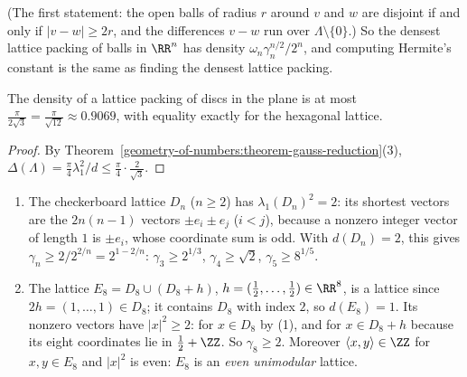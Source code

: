 (The first statement: the open balls of radius $r$ around $v$ and $w$ are disjoint if and only if $|v - w| \geq 2r$, and the differences $v - w$ run over $\Lambda \setminus \{0\}$.) So the densest lattice
packing of balls in $\RR^n$ has density $\omega_n\gamma_n^{n/2}/2^n$, and computing Hermite's constant is the same as finding the densest lattice packing.

\begin{corollary}[Lagrange]\label{geometry-of-numbers:corollary-hexagonal-packing}
The density of a lattice packing of discs in the plane is at most $\frac{\pi}{2\sqrt3} = \frac{\pi}{\sqrt{12}} \approx 0.9069$, with equality exactly for the hexagonal lattice.
\end{corollary}

\begin{proof}
By Theorem~\ref{geometry-of-numbers:theorem-gauss-reduction}(3), $\Delta(\Lambda) = \frac{\pi}{4}\lambda_1^2/d \leq \frac{\pi}{4}\cdot\frac{2}{\sqrt3}$.
\end{proof}

\begin{example}\label{geometry-of-numbers:example-hermite-dn}
\begin{enumerate}
\item The checkerboard lattice $D_n$ ($n \geq 2$) has $\lambda_1(D_n)^2 = 2$: its shortest vectors are the $2n(n - 1)$ vectors $\pm e_i \pm e_j$ ($i < j$), because a nonzero integer vector of length $1$ is
$\pm e_i$, whose coordinate sum is odd. With $d(D_n) = 2$, this gives $\gamma_n \geq 2/2^{2/n} = 2^{1 - 2/n}$: $\gamma_3 \geq 2^{1/3}$, $\gamma_4 \geq \sqrt2$, $\gamma_5 \geq 8^{1/5}$.
\item The lattice $E_8 = D_8 \cup (D_8 + h)$, $h = (\frac12, \ldots, \frac12) \in \RR^8$, is a lattice since $2h = (1, \ldots, 1) \in D_8$; it contains $D_8$ with index $2$, so $d(E_8) = 1$. Its nonzero vectors
have $|x|^2 \geq 2$: for $x \in D_8$ by (1), and for $x \in D_8 + h$ because its eight coordinates lie in $\frac12 + \ZZ$. So $\gamma_8 \geq 2$. Moreover $\langle x, y \rangle \in \ZZ$ for $x, y \in E_8$ and
$|x|^2$ is even: $E_8$ is an \emph{even unimodular} lattice.
\end{enumerate}
\end{example}

